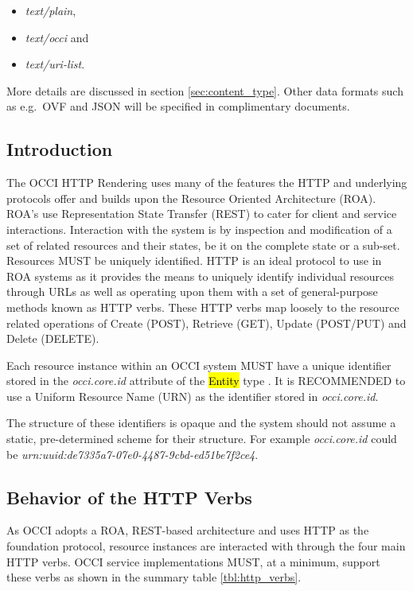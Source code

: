 \documentclass[10pt,a4paper]{article}
\begin{document}
\begin{itemize}
	\item \textit{text/plain},
	\item \textit{text/occi} and 
	\item \textit{text/uri-list}. 
\end{itemize}

More details are discussed in section \ref{sec:content_type}. Other
data formats such as e.g.~OVF and JSON will be specified in
complimentary documents.

\subsection{Introduction}
The OCCI HTTP Rendering uses many of the features the HTTP and
underlying protocols offer and builds upon the Resource Oriented
Architecture (ROA). ROA's use Representation State Transfer (REST)
\cite{REST_Fielding} to cater for client and service
interactions. Interaction with the system is by inspection and
modification of a set of related resources and their states, be it on
the complete state or a sub-set. Resources MUST be uniquely
identified. HTTP is an ideal protocol to use in ROA systems as it
provides the means to uniquely identify individual resources through
URLs as well as operating upon them with a set of general-purpose
methods known as HTTP verbs. These HTTP verbs map loosely to the
resource related operations of Create (POST), Retrieve (GET), Update
(POST/PUT) and Delete (DELETE).

Each resource instance within an OCCI system MUST have a unique
identifier stored in the \emph{occi.core.id} attribute of the
\hl{Entity} type \cite{occi:core}.
It is RECOMMENDED to use a Uniform Resource Name (URN) as the
identifier stored in \emph{occi.core.id}.

The structure of these identifiers is opaque and the system should not
assume a static, pre-determined scheme for their structure. For
example \emph{occi.core.id} could be
\emph{urn:uuid:de7335a7-07e0-4487-9cbd-ed51be7f2ce4}.

\subsection{Behavior of the HTTP Verbs}
As OCCI adopts a ROA, REST-based architecture and uses HTTP as the
foundation protocol, resource instances are interacted with through
the four main HTTP verbs. OCCI service implementations MUST, at a
minimum, support these verbs as shown in the summary table
\ref{tbl:http_verbs}.
\end{document}

